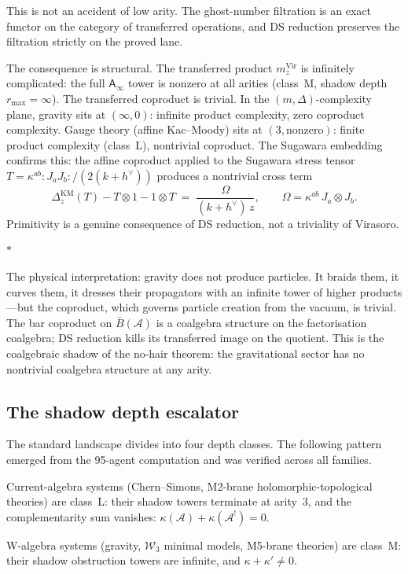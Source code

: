\documentclass[11pt]{article}
\newcommand{\cA}{\mathcal{A}}
\newcommand{\cW}{\mathcal{W}}
\newcommand{\B}{\bar{B}}
\newcommand{\Ainf}{\mathsf{A}_{\infty}}
\newcommand{\normord}[1]{:\!#1\!:}
\newcommand{\sep}{\bigskip\begin{center}$*$\end{center}\medskip}
\begin{document}
This is not an accident of low arity.  The ghost-number filtration
is an exact functor on the category of transferred operations, and
DS reduction preserves the filtration strictly on the proved lane.

The consequence is structural.  The transferred product
$m_z^{\mathrm{Vir}}$ is infinitely complicated: the full
$\Ainf$ tower is nonzero at all arities (class~M, shadow
depth $r_{\max} = \infty$).  The transferred coproduct is
trivial.  In the $(m, \Delta)$-complexity plane, gravity sits
at $(\infty, 0)$: infinite product complexity, zero coproduct
complexity.  Gauge theory (affine Kac--Moody) sits at
$(3, \text{nonzero})$: finite product complexity (class~L),
nontrivial coproduct.  The Sugawara embedding confirms this:
the affine coproduct applied to the Sugawara stress tensor
$T = \kappa^{ab}\normord{J_a J_b}/(2(k + h^\vee))$ produces a
nontrivial cross term
\[
\Delta_z^{\mathrm{KM}}(T) - T \otimes 1 - 1 \otimes T
\;=\;
\frac{\Omega}{(k + h^\vee)\, z},
\qquad
\Omega = \kappa^{ab}\, J_a \otimes J_b.
\]
Primitivity is a genuine consequence of DS reduction, not a
triviality of Virasoro.

\sep

The physical interpretation: gravity does not produce particles.
It braids them, it curves them, it dresses their propagators
with an infinite tower of higher products---but the coproduct,
which governs particle creation from the vacuum, is trivial.
The bar coproduct on $\B(\cA)$ is a coalgebra structure on
the factorisation coalgebra; DS reduction kills its transferred
image on the quotient.  This is the coalgebraic shadow of the
no-hair theorem: the gravitational sector has no nontrivial
coalgebra structure at any arity.


\subsection{The shadow depth escalator}
\label{sec:depth-escalator}

The standard landscape divides into four depth classes.
The following pattern emerged from the 95-agent computation
and was verified across all families.

Current-algebra systems (Chern--Simons, M2-brane
holomorphic-topological theories) are class~L: their shadow
towers terminate at arity~$3$, and the complementarity sum
vanishes: $\kappa(\cA) + \kappa(\cA^!) = 0$.

W-algebra systems (gravity, $\cW_3$ minimal models, M5-brane
theories) are class~M: their shadow obstruction towers are infinite, and
$\kappa + \kappa' \neq 0$.
\end{document}
